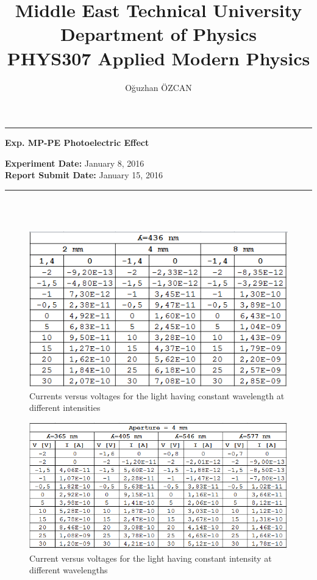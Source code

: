 \documentclass[a4paper,12pt]{article}
\title{Middle East Technical University\\Department of Physics\\\textbf{PHYS307 Applied Modern Physics}}
\author{Oğuzhan ÖZCAN\\}
\date{}
\providecommand{\expdate}[1]{\textbf{Experiment Date:} }
\providecommand{\repdate}[1]{\textbf{Report Submit Date:} }
\providecommand{\expname}[1]{\textbf{Exp. MP-PE Photoelectric Effect} }
\begin{document}
\maketitle

\thispagestyle{fancy}

\noindent\rule{18.4cm}{0.8pt}
\begin{center}
	\expname{arg1}{}
\end{center}

\expdate{November 6, 2015}{January 8, 2016}\\
\repdate{arg1}{January 15, 2016}\\
\noindent\rule{18.4cm}{0.8pt}\\\\
\begin{figure}[h!]
\centering
\includegraphics[scale = 0.7]{TABLE1}
\caption{Currents versus voltages for the light having constant wavelength at different intensities}
\label{fig:TABLE1}
\end{figure}
\begin{figure}[h!]
\centering
\includegraphics[scale = 0.7]{TABLE2}
\caption{Current versus voltages for the light having constant intensity at different wavelengths}
\label{fig:TABLE2}
\end{figure}
\end{document}

